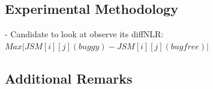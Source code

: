 \subsection{Experimental Methodology}
\label{subsec:exptmet}

- Candidate to look at observe its diffNLR: $Max | JSM[i][j](buggy) - JSM[i][j](bugfree)| $

\subsection{Additional Remarks}
\label{subsec:addrem}